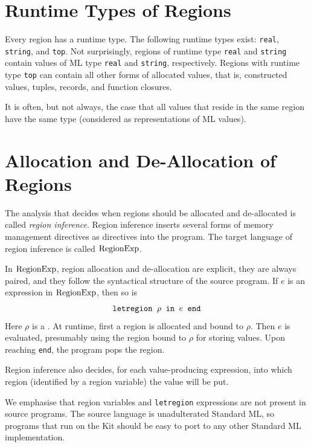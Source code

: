 \documentclass[12pt]{book}
\begin{document}
\section{Runtime Types of Regions}
\label{runtimetypes.sec}
Every region has a runtime type. The following
runtime types exist: {\tt real}, {\tt string}, and {\tt top}. Not
surprisingly, regions of runtime type {\tt real} and {\tt string}
contain values of ML type {\tt real} and {\tt string}, respectively.
Regions with runtime type {\tt top} can contain all other forms of
allocated values, that is, constructed values, tuples, records, and
function closures.

It is often, but not always, the case that all values that reside in the
same region have the same type (considered as representations of ML values).
 
\section{Allocation and De-Allocation of Regions}
\label{aldeal.sec}
The analysis that decides when regions should be allocated and de-allocated
is called {\em region inference}. Region inference inserts 
several forms of memory management directives
as directives into the program.
The target language of region inference is called $\hbox{\rm RegionExp}$.

In $\hbox{\rm RegionExp}$, 
region allocation and de-allocation are explicit, they are always paired,
and they follow
the syntactical structure of the source program. 
If $e$ is an expression in $\hbox{\rm RegionExp}$, then so is
$$\hbox{\tt letregion $\rho$ in $e$ end}$$
Here $\rho$ is a . At runtime, first a region
is allocated and bound to $\rho$. Then $e$ is evaluated, presumably using
the region bound to $\rho$ for storing values. Upon reaching {\tt end}, the program pops the
region.

Region inference also decides, for each value-producing expression, 
into which region (identified by a region variable) the value will be put.

We emphasise that region variables and {\tt letregion} expressions are
not present in source programs. The source language is unadulterated
Standard ML, so programs  that run on the Kit should be easy to port to any 
other Standard ML implementation.

\end{document}
